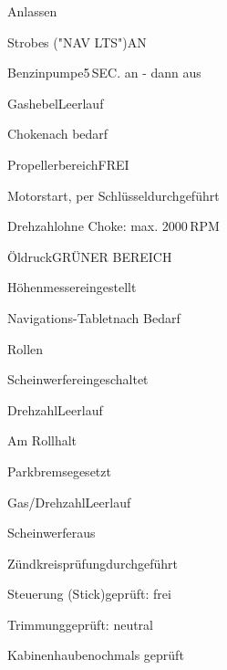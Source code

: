 \begin{checklist}{Anlassen}
	\item{Strobes ("NAV LTS")}{AN}
	\item{Benzinpumpe}{5\,SEC. an - dann aus}
	\item{Gashebel}{Leerlauf}
	\item{Choke}{nach bedarf}
	\item{Propellerbereich}{FREI}
	\item{Motorstart, per Schlüssel}{durchgeführt}
	\item{Drehzahl}{ohne Choke: max. 2000\,RPM}
	\item{Öldruck}{GRÜNER BEREICH}
	\item{Höhenmesser}{eingestellt}
	\item{Navigations-Tablet}{nach Bedarf}
\end{checklist}

\begin{checklist}{Rollen}
	\item{Scheinwerfer}{eingeschaltet}
	\item{Drehzahl}{Leerlauf}
\end{checklist}

\begin{checklist}{Am Rollhalt}
	\item{Parkbremse}{gesetzt}
	\item{Gas/Drehzahl}{Leerlauf}
	\item{Scheinwerfer}{aus}
	\item{Zündkreisprüfung}{durchgeführt}
	\item{Steuerung (Stick)}{geprüft: frei}
	\item{Trimmung}{geprüft: neutral}
	\item{Kabinenhaube}{nochmals geprüft}
\end{checklist}

